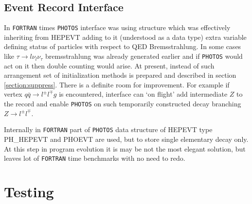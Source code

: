 \documentclass[]{Photos_interface_design}
\begin{document}
 
\subsection{Event Record Interface}
In {\tt FORTRAN} times {\tt PHOTOS} interface was using structure which was effectively
inheriting from  HEPEVT
adding to it (understood as a data type) extra variable defining 
status of particles with respect to QED Bremsstrahlung. In some cases like
$\tau \to l \nu_l \nu_\tau$ bremsstrahlung was already generated earlier
and if {\tt PHOTOS} would act on it then double counting would arise.
At present, instead of such arrangement set of initialization methods is 
prepared and described in section \ref{section:suppress}. There is a definite room for 
improvement. For example if vertex $q \bar q \to l^\pm l^\mp g$ is encountered,
interface can `on flight' add intermediate $Z$ to the record and enable {\tt PHOTOS}
on such temporarily constructed decay branching $Z \to l^\pm l^\mp $.


 Internally in {\tt FORTRAN} part of {\tt PHOTOS}
data structure of HEPEVT type PH\_HEPEVT and PHOEVT are used, but  to store 
single elementary decay only. At this step in program evolution it is may be 
not the most elegant solution, but leaves lot of {\tt FORTRAN} time benchmarks 
with no  need to redo.




\section{Testing}
\end{document}
